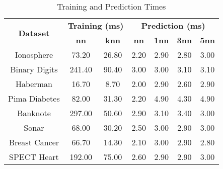\begin{table}[htbp]
\caption{Training and Prediction Times}
\begin{center}
\begin{tabular}{|c|c|c|c|c|c|c|}
\hline
\multirow{2}{*}{\textbf{Dataset}} & \multicolumn{2}{c|}{\textbf{Training (ms)}} & \multicolumn{4}{c|}{\textbf{Prediction (ms)}} \\ \cline{2-7}
 & \textbf{nn} & \textbf{knn} & \textbf{nn} & \textbf{1nn} & \textbf{3nn} & \textbf{5nn} \\ \hline
Ionosphere & 73.20 & 26.80 & 2.20 & 2.90 & 2.80 & 3.00 \\ \hline
Binary Digits & 241.40 & 90.40 & 3.00 & 3.00 & 3.10 & 3.10 \\ \hline
Haberman & 16.70 & 8.70 & 2.00 & 2.90 & 2.60 & 2.90 \\ \hline
Pima Diabetes & 82.00 & 31.30 & 2.20 & 4.90 & 4.30 & 4.90 \\ \hline
Banknote & 297.00 & 50.60 & 2.90 & 3.10 & 3.40 & 3.00 \\ \hline
Sonar & 68.00 & 30.20 & 2.50 & 3.00 & 2.90 & 3.00 \\ \hline
Breast Cancer & 66.70 & 14.30 & 2.10 & 3.00 & 2.90 & 2.80 \\ \hline
SPECT Heart & 192.00 & 75.00 & 2.60 & 2.90 & 2.90 & 3.00 \\ \hline
\end{tabular}
\label{tab:timing}
\end{center}
\end{table}